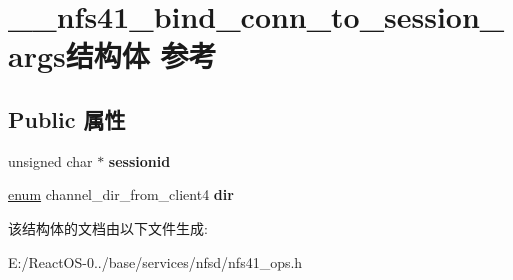 \hypertarget{struct____nfs41__bind__conn__to__session__args}{}\section{\+\_\+\+\_\+nfs41\+\_\+bind\+\_\+conn\+\_\+to\+\_\+session\+\_\+args结构体 参考}
\label{struct____nfs41__bind__conn__to__session__args}
\subsection*{Public 属性}
\begin{DoxyCompactItemize}
\item 
\mbox{\label{struct____nfs41__bind__conn__to__session__args_a9df22557564772e6cfdc991747cd917d}} 
unsigned char $\ast$ {\bfseries sessionid}
\item 
\mbox{\label{struct____nfs41__bind__conn__to__session__args_aafa8c64ea685081ff989f942a3c34cf6}} 
\hyperlink{interfaceenum}{enum} channel\+\_\+dir\+\_\+from\+\_\+client4 {\bfseries dir}
\end{DoxyCompactItemize}


该结构体的文档由以下文件生成\+:\begin{DoxyCompactItemize}
\item 
E\+:/\+React\+O\+S-\/0../base/services/nfsd/nfs41\+\_\+ops.\+h\end{DoxyCompactItemize}
